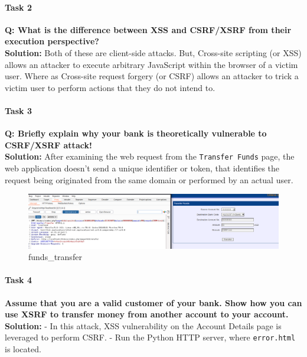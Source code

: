 \hypertarget{task-2}{%
\paragraph{Task 2}\label{task-2}}

\textbf{Q: What is the difference between XSS and CSRF/XSRF from their
execution perspective?}\\
\textbf{Solution:} Both of these are client-side attacks. But,
Cross-site scripting (or XSS) allows an attacker to execute arbitrary
JavaScript within the browser of a victim user. Where as Cross-site
request forgery (or CSRF) allows an attacker to trick a victim user to
perform actions that they do not intend to.

\hypertarget{task-3}{%
\paragraph{Task 3}\label{task-3}}

\textbf{Q: Briefly explain why your bank is theoretically vulnerable to
CSRF/XSRF attack!}\\
\textbf{Solution:} After examining the web request from the
\texttt{Transfer\ Funds} page, the web application doesn't send a unique
identifier or token, that identifies the request being originated from
the same domain or performed by an actual user.

\begin{figure}
\centering
\includegraphics{images/task2/funds_transfer.PNG}
\caption{funds\_transfer}
\end{figure}

\hypertarget{task-4}{%
\paragraph{Task 4}\label{task-4}}

\textbf{Assume that you are a valid customer of your bank. Show how you
can use XSRF to transfer money from another account to your account.}
\textbf{Solution:} - In this attack, XSS vulnerability on the Account
Details page is leveraged to perform CSRF. - Run the Python HTTP server,
where \texttt{error.html} is located.

